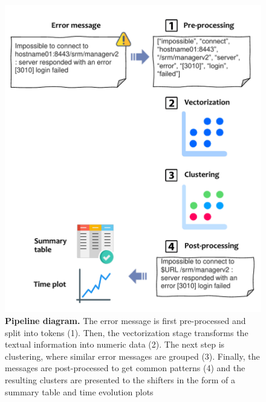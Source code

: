\begin{figure}
    \centering
    \includegraphics[width=.8\textwidth]{figures/410_method/pipeline.pdf}
    \caption{\textbf{Pipeline diagram.}
    The error message is first pre-processed and split into tokens (1). Then, the vectorization stage transforms the textual information into numeric data (2).
    The next step is clustering, where similar error messages are grouped (3).
    Finally, the messages are post-processed to get common patterns (4) and the resulting clusters are presented to the shifters in the form of a summary table and time evolution plots
    }
    \label{fig:pipeline_diagram}
\end{figure}




